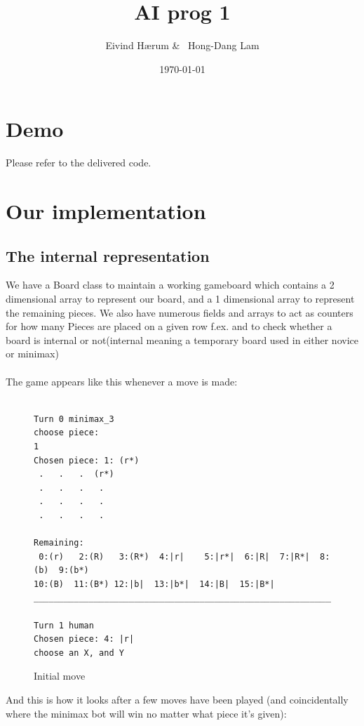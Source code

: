 \documentclass[12pt, a4paper]{article}
\title{AI prog 1}
\author{Eivind Hærum \& \ Hong-Dang Lam}
\date{\today} %
\begin{document}
\maketitle
% 
% 
 
\newpage
\tableofcontents
\newpage
 
\section{Demo}
Please refer to the delivered code.

\section{Our implementation}

\subsection{The internal representation}
We have a Board class to maintain a working gameboard which contains a 2 dimensional array to represent our board, and a 1 dimensional array to represent the remaining pieces. We also have numerous fields and arrays to act as counters for how many Pieces are placed on a given row f.ex. and to check whether a board is internal or not(internal meaning a temporary board used in either novice or minimax)\\ \\
The game appears like this whenever a move is made:\\
\begin{figure}[H]
\begin{verbatim}

Turn 0 minimax_3
choose piece:
1
Chosen piece: 1: (r*)
 .   .   .  (r*)
 .   .   .   . 
 .   .   .   . 
 .   .   .   . 

Remaining:
 0:(r)   2:(R)   3:(R*)  4:|r|    5:|r*|  6:|R|  7:|R*|  8:(b)  9:(b*)  
10:(B)  11:(B*) 12:|b|  13:|b*|  14:|B|  15:|B*|  
____________________________________________________________

Turn 1 human
Chosen piece: 4: |r|
choose an X, and Y
\end{verbatim}
\caption{Initial move}
\label{figure1}
\end{figure}
\noindent
And this is how it looks after a few moves have been played (and coincidentally where the minimax bot will win no matter what piece it's given):\\
\end{document}

